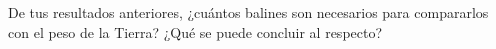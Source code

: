 \documentclass[../main]{subfiles}
\begin{document}
    \begin{exercise}
        De tus resultados anteriores, ¿cuántos balines son necesarios para compararlos con el peso de la Tierra? ¿Qué se puede concluir al respecto?
    \end{exercise}
\end{document}
